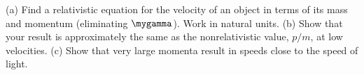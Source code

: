 (a) Find a relativistic equation for the velocity of an
object in terms of its mass and momentum (eliminating $\mygamma$).
Work in natural units. \answercheck\hwendpart
(b) Show that your result is
approximately the same as the nonrelativistic value, $p/m$, at low
velocities. \hwendpart
(c) Show that very large momenta result in
speeds close to the speed of light.
